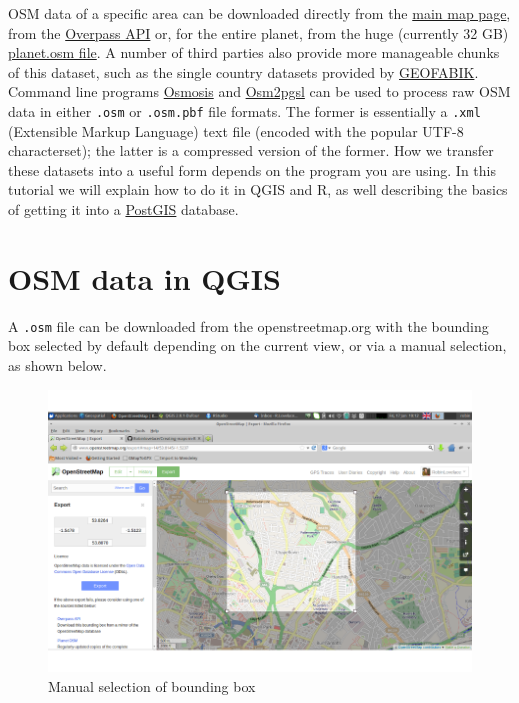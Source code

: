 \documentclass[]{article}
\begin{document}
OSM data of a specific area can be downloaded directly from the
\href{http://www.openstreetmap.org}{main map page}, from the
\href{http://overpass-api.de/}{Overpass API} or, for the entire planet,
from the huge (currently 32 GB)
\href{http://planet.openstreetmap.org/}{planet.osm file}. A number of
third parties also provide more manageable chunks of this dataset, such
as the single country datasets provided by
\href{http://download.geofabrik.de/}{GEOFABIK}. Command line programs
\href{http://wiki.openstreetmap.org/wiki/Osmosis}{Osmosis} and
\href{http://wiki.openstreetmap.org/wiki/Osm2pgsql}{Osm2pgsl} can be
used to process raw OSM data in either \texttt{.osm} or
\texttt{.osm.pbf} file formats. The former is essentially a
\texttt{.xml} (Extensible Markup Language) text file (encoded with the
popular UTF-8 characterset); the latter is a compressed version of the
former. How we transfer these datasets into a useful form depends on the
program you are using. In this tutorial we will explain how to do it in
QGIS and R, as well describing the basics of getting it into a
\href{http://postgis.net/}{PostGIS} database.

\section{OSM data in QGIS}\label{osm-data-in-qgis}

A \texttt{.osm} file can be downloaded from the openstreetmap.org with
the bounding box selected by default depending on the current view, or
via a manual selection, as shown below.

\begin{figure}[htbp]
\centering
\includegraphics{figure/Manual_selection_of_bounding_box.png}
\caption{Manual selection of bounding box}
\end{figure}
\end{document}
